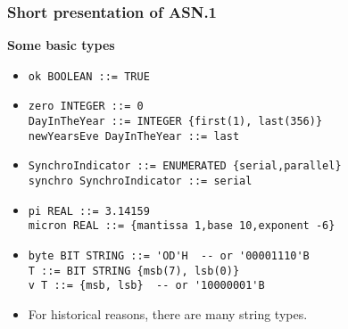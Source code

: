 \documentclass[compress,dvips,xcolor={dvipsnames},t]{beamer}
\newcommand\ASN{\textsf{ASN.1}\xspace}
\begin{document}
\begin{frame}[containsverbatim]
\frametitle{Short presentation of \ASN}

\noindent
\textbf{Some basic types}
\begin{itemize}

  \item \verb+ok BOOLEAN ::= TRUE+


  \item 

\begin{verbatim} 
zero INTEGER ::= 0 
DayInTheYear ::= INTEGER {first(1), last(356)}
newYearsEve DayInTheYear ::= last
\end{verbatim}

  \item 
\begin{verbatim}
SynchroIndicator ::= ENUMERATED {serial,parallel}
synchro SynchroIndicator ::= serial
\end{verbatim}

  \item

\begin{verbatim}
pi REAL ::= 3.14159
micron REAL ::= {mantissa 1,base 10,exponent -6}
\end{verbatim}

  \item 

\begin{verbatim}
byte BIT STRING ::= 'OD'H  -- or '00001110'B
T ::= BIT STRING {msb(7), lsb(0)}
v T ::= {msb, lsb}  -- or '10000001'B
\end{verbatim}



  \item For historical reasons, there are many string types.

\end{itemize}

\end{frame}
\end{document}
